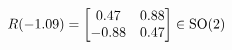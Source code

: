 \documentclass[preview]{standalone}
\begin{document}
\begin{align*}
\special{dvisvgm:raw <g id='unique000'>}R(-1.09) = \begin{bmatrix} 0.47 & 0.88 \\ -0.88 & 0.47 \end{bmatrix} \in \text{SO}(2)\special{dvisvgm:raw </g>}
\end{align*}
\end{document}
